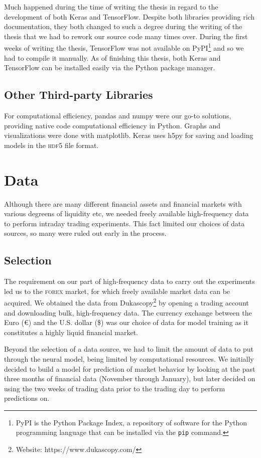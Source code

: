 \begin{multicols}{2}
Much happened during the time of writing the thesis in regard to the development
of both Keras and TensorFlow.  Despite both libraries providing rich
documentation, they both changed to such a degree during the writing of the
thesis that we had to rework our source code many times over.  During the first
weeks of writing the thesis, TensorFlow was not available on PyPI\footnote{PyPI
  is the Python Package Index, a repository of software for the Python
  programming language that can be installed via the \texttt{pip} command.} and
so we had to compile it manually.  As of finishing this thesis, both Keras and
TensorFlow can be installed easily via the Python package manager.

\subsection{Other Third-party Libraries}

For computational efficiency, pandas and numpy were our go-to solutions, providing
native code computational efficiency in Python.  Graphs and visualizations were
done with matplotlib. Keras uses h5py for saving and loading models in the
\textsc{hdf5} file format.

\section{Data}

Although there are many different financial assets and financial markets with
various degreens of liquidity etc, we needed freely available high-frequency
data to perform intraday trading experiments.  This fact limited our choices of
data sources, so many were ruled out early in the process.

\subsection{Selection}

The requirement on our part of high-frequency data to carry out the experiments
led us to the \textsc{forex} market, for which freely available market data can
be acquired.  We obtained the data from Dukascopy\footnote{Website:
  https://www.dukascopy.com/} by opening a trading account and downloading bulk,
high-frequency data.  The currency exchange between the Euro (€) and the
U.S. dollar (\$) was our choice of data for model training as it constitutes a
highly liquid financial market.

Beyond the selection of a data source, we had to limit the amount of data to put
through the neural model, being limited by computational resources.  We
initially decided to build a model for prediction of market behavior by looking
at the past three months of financial data (November through January), but later
decided on using the two weeks of trading data prior to the trading day to
perform predictions on.


\end{multicols}
